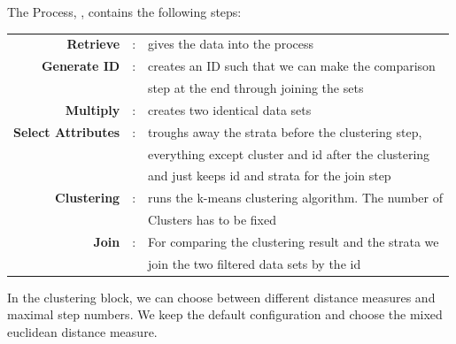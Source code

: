 	The Process, , contains the following steps:\\
	\begin{tabular}{r c l}
		\textbf{Retrieve} & : &  gives the data into the process \\
		\textbf{Generate ID} & : & creates an ID such that we can make the comparison\\
		 & & step at the end through joining the sets\\
		\textbf{Multiply} & : & creates two identical data sets\\
		\textbf{Select Attributes} & : &  troughs away the strata before the clustering step,\\
		& & everything except cluster and id after the clustering \\
		& & and just keeps id and strata for the join step\\
		\textbf{Clustering} & : &  runs the k-means clustering algorithm. The number of \\
		& & Clusters has to be fixed \\
		\textbf{Join} & : & For comparing the clustering result and the strata we \\
		& & join the two filtered data sets by the id \\
	\end{tabular}
	
	In the clustering block, we can choose between different distance measures and maximal step numbers. We keep the default configuration and choose the mixed euclidean distance measure.
\vspace*{-1em}
